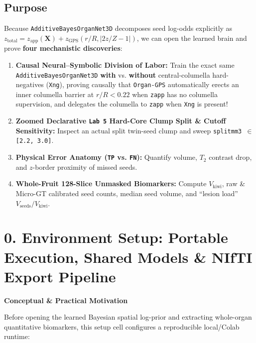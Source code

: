 \documentclass[10pt,a4paper]{article}
\renewcommand{\_}{\origunderscore\allowbreak}
\begin{document}
\subsection*{Purpose}
Because \texttt{AdditiveBayesOrganNet3D} decomposes seed log-odds explicitly as $z_{\text{total}} = z_{\text{app}}(\mathbf{X}) + z_{\text{GPS}}(r/R, |2z/Z - 1|)$, we can open the learned brain and prove \textbf{four mechanistic discoveries}:
\begin{enumerate}
\item \textbf{Causal Neural--Symbolic Division of Labor:} Train the exact same \texttt{AdditiveBayesOrganNet3D} \textbf{with} vs. \textbf{without} central-columella hard-negatives (\texttt{X\_ng}), proving causally that \texttt{Organ-GPS} automatically erects an inner columella barrier at $r/R < 0.22$ when \texttt{z\_app} has no columella supervision, and delegates the columella to \texttt{z\_app} when \texttt{X\_ng} is present!
\item \textbf{Zoomed Declarative \texttt{Lab 5} Hard-Core Clump Split \& Cutoff Sensitivity:} Inspect an actual split twin-seed clump and sweep \texttt{split\_mm3 $\in$ [2.2, 3.0]}.
\item \textbf{Physical Error Anatomy (\texttt{TP} vs. \texttt{FN}):} Quantify volume, $T_2$ contrast drop, and $z$-border proximity of missed seeds.
\item \textbf{Whole-Fruit 128-Slice Unmasked Biomarkers:} Compute $V_{\text{kiwi}}$, raw \& Micro-GT calibrated seed counts, median seed volume, and ``lesion load'' $V_{\text{seeds}} / V_{\text{kiwi}}$.
\end{enumerate}

\section*{0. Environment Setup: Portable Execution, Shared Models \& NIfTI Export Pipeline}

\begin{guidehdr}
{\small\bfseries\color{kiwigreen!75!black}Conceptual \& Practical Motivation}
\end{guidehdr}
Before opening the learned Bayesian spatial log-prior and extracting whole-organ quantitative biomarkers, this setup cell configures a reproducible local/\allowbreak{}Colab runtime:
\end{document}
